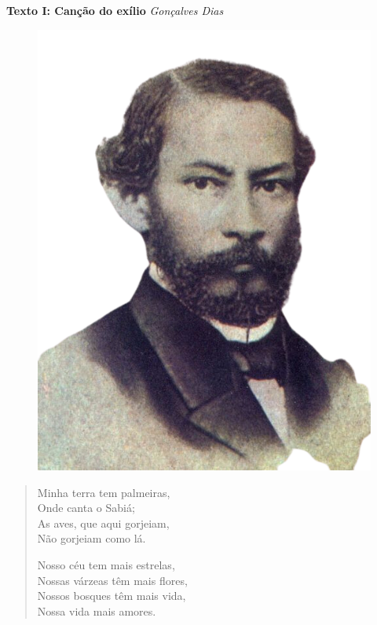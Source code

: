 \begin{myquote}

\textbf{Texto I: Canção do exílio}
\emph{Gonçalves Dias}

\begin{figure}[H]
\centering
\includegraphics[scale=0.25]{./imgSAEB_7_POR/media/image36.png}
\end{figure}

\begin{verse}

Minha terra tem palmeiras, \\
Onde canta o Sabiá; \\
As aves, que aqui gorjeiam, \\
Não gorjeiam como lá. 

Nosso céu tem mais estrelas,\\
Nossas várzeas têm mais flores, \\
Nossos bosques têm mais vida, \\
Nossa vida mais amores.


\end{verse}
\end{myquote}
